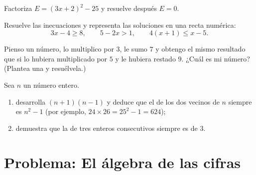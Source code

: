\begin{exercise}[$\star\star$]\label{exo:g9:algebra:7}
Factoriza $E = (3x + 2)^2 - 25$ y resuelve después $E = 0$.
\end{exercise}

\begin{exercise}[$\star\star$]\label{exo:g9:algebra:8}
Resuelve las inecuaciones y representa las soluciones en una recta numérica:
\[
3x - 4 \geq 8, \qquad
5 - 2x > 1, \qquad
4(x + 1) \leq x - 5 .
\]
\end{exercise}

\begin{exercise}[$\star\star$]\label{exo:g9:algebra:9}
Pienso un número, lo multiplico por $3$, le sumo $7$ y obtengo el mismo resultado
que si lo hubiera multiplicado por $5$ y le hubiera restado $9$. ¿Cuál es mi número?
(Plantea una  y resuélvela.)
\end{exercise}

\begin{exercise}[$\star\star\star$]\label{exo:g9:algebra:10}
Sea $n$ un número entero.
\begin{enumerate}
  \item desarrolla $(n + 1)(n - 1)$ y deduce que el  de los dos
        vecinos de $n$ siempre es $n^2 - 1$ (por ejemplo, $24 \times 26 =
        25^2 - 1 = 624$);
  \item demuestra que la  de tres enteros consecutivos siempre es
         de $3$.
\end{enumerate}
\end{exercise}

\section{Problema: El álgebra de las cifras}

